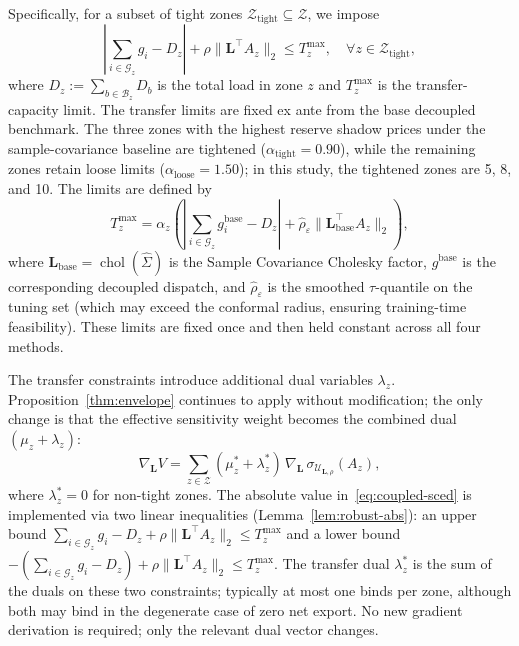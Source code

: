\documentclass[11pt]{article}
\newcommand{\cU}{\mathcal{U}}
\newcommand{\cG}{\mathcal{G}}
\newcommand{\cB}{\mathcal{B}}
\newcommand{\cZ}{\mathcal{Z}}
\newcommand{\bL}{\bm{L}}
\DeclareMathOperator{\chol}{chol}
\theoremstyle{definition}
\begin{document}
Specifically, for a subset of tight zones $\cZ_{\text{tight}} \subseteq \cZ$, we impose
\begin{equation}\label{eq:coupled-sced}
\left|\sum_{i \in \cG_z} g_i - D_z\right| + \rho\|\bL^\top A_z\|_2 \leq T_z^{\max}, \quad \forall z \in \cZ_{\text{tight}},
\end{equation}
where $D_z := \sum_{b \in \cB_z} D_b$ is the total load in zone $z$ and $T_z^{\max}$ is the transfer-capacity limit. The transfer limits are fixed ex ante from the base decoupled benchmark. The three zones with the highest reserve shadow prices under the sample-covariance baseline are tightened ($\alpha_{\text{tight}} = 0.90$), while the remaining zones retain loose limits ($\alpha_{\text{loose}} = 1.50$); in this study, the tightened zones are 5, 8, and 10. The limits are defined by
\begin{equation}
T_z^{\max} = \alpha_z \left(\left|\sum_{i\in\cG_z} g_i^{\mathrm{base}} - D_z\right| + \hat{\rho}_{\varepsilon} \|\bL_{\mathrm{base}}^\top A_z\|_2\right),
\end{equation}
where $\bL_{\mathrm{base}} = \chol(\hat\Sigma)$ is the Sample Covariance Cholesky factor, $g^{\mathrm{base}}$ is the corresponding decoupled dispatch, and $\hat{\rho}_{\varepsilon}$ is the smoothed $\tau$-quantile on the tuning set (which may exceed the conformal radius, ensuring training-time feasibility). These limits are fixed once and then held constant across all four methods.

The transfer constraints introduce additional dual variables $\lambda_z$. Proposition~\ref{thm:envelope} continues to apply without modification; the only change is that the effective sensitivity weight becomes the combined dual $(\mu_z + \lambda_z)$:
\begin{equation}\label{eq:coupled-gradient}
\nabla_{\bL} V = \sum_{z \in \cZ} (\mu_z^* + \lambda_z^*)\, \nabla_{\bL}\, \sigma_{\cU_{\bL,\rho}}(A_z),
\end{equation}
where $\lambda_z^* = 0$ for non-tight zones. The absolute value in~\eqref{eq:coupled-sced} is implemented via two linear inequalities (Lemma~\ref{lem:robust-abs}): an upper bound $\sum_{i \in \cG_z} g_i - D_z + \rho\|\bL^\top A_z\|_2 \leq T_z^{\max}$ and a lower bound $-(\sum_{i \in \cG_z} g_i - D_z) + \rho\|\bL^\top A_z\|_2 \leq T_z^{\max}$. The transfer dual $\lambda_z^*$ is the sum of the duals on these two constraints; typically at most one binds per zone, although both may bind in the degenerate case of zero net export. No new gradient derivation is required; only the relevant dual vector changes.
\end{document}
